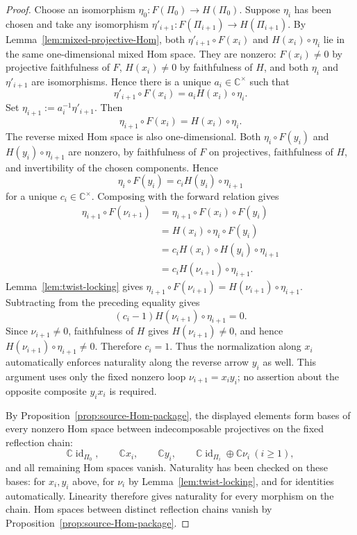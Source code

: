 \documentclass[10pt,a4paper]{amsart}
\def\C{\mathbb{C}}
\newcommand{\id}{\operatorname{id}}
\begin{document}
\begin{proof}
Choose an isomorphism $\eta_0:F(\Pi_0)\to H(\Pi_0)$.  Suppose $\eta_i$
has been chosen and take any isomorphism
$\eta'_{i+1}:F(\Pi_{i+1})\to H(\Pi_{i+1})$.  By
Lemma~\ref{lem:mixed-projective-Hom}, both
$\eta'_{i+1}\circ F(x_i)$ and $H(x_i)\circ\eta_i$ lie in the same one-dimensional
mixed Hom space.  They are nonzero: $F(x_i)\ne0$ by projective faithfulness of $F$,
$H(x_i)\ne0$ by faithfulness of $H$, and both $\eta_i$ and
$\eta'_{i+1}$ are isomorphisms.  Hence there is a unique
$a_i\in\C^\times$ such that
\[
 \eta'_{i+1}\circ F(x_i)=a_i H(x_i)\circ\eta_i.
\]
Set $\eta_{i+1}:=a_i^{-1}\eta'_{i+1}$.  Then
\begin{equation}\label{eq:forward-naturality}
 \eta_{i+1}\circ F(x_i)=H(x_i)\circ\eta_i.
\end{equation}
The reverse mixed Hom space is also one-dimensional.  Both
$\eta_i\circ F(y_i)$ and $H(y_i)\circ\eta_{i+1}$ are nonzero, by
faithfulness of $F$ on projectives, faithfulness of $H$, and invertibility
of the chosen components.  Hence
\begin{equation}\label{eq:reverse-scalar}
 \eta_i\circ F(y_i)=c_iH(y_i)\circ\eta_{i+1}
\end{equation}
for a unique $c_i\in\C^\times$.  Composing with the forward relation gives
\begin{align*}
 \eta_{i+1}\circ F(\nu_{i+1})
 &=\eta_{i+1}\circ F(x_i)\circ F(y_i)\\
 &=H(x_i)\circ\eta_i\circ F(y_i)\\
 &=c_iH(x_i)\circ H(y_i)\circ\eta_{i+1}\\
 &=c_iH(\nu_{i+1})\circ\eta_{i+1}.
\end{align*}
Lemma~\ref{lem:twist-locking} gives
$\eta_{i+1}\circ F(\nu_{i+1})=
H(\nu_{i+1})\circ\eta_{i+1}$.  Subtracting from the
preceding equality gives
\[
 (c_i-1)H(\nu_{i+1})\circ\eta_{i+1}=0.
\]
Since $\nu_{i+1}\ne0$, faithfulness of $H$ gives
$H(\nu_{i+1})\ne0$, and hence
$H(\nu_{i+1})\circ\eta_{i+1}\ne0$.  Therefore $c_i=1$.  Thus the normalization along $x_i$ automatically
enforces naturality along the reverse arrow $y_i$ as well.  This argument
uses only the fixed nonzero loop $\nu_{i+1}=x_i y_i$; no assertion about
the opposite composite $y_i x_i$ is required.

By Proposition~\ref{prop:source-Hom-package}, the displayed elements form
bases of every nonzero Hom space between indecomposable projectives on the
fixed reflection chain:
\[
 \C\id_{\Pi_0},\qquad \C x_i,\qquad \C y_i,
 \qquad \C\id_{\Pi_i}\oplus\C\nu_i\ (i\ge1),
\]
and all remaining Hom spaces vanish.  Naturality has been checked on these
bases: for $x_i,y_i$ above, for $\nu_i$ by
Lemma~\ref{lem:twist-locking}, and for identities automatically.  Linearity
therefore gives naturality for every morphism on the chain.  Hom spaces between distinct reflection chains vanish by
Proposition~\ref{prop:source-Hom-package}.


\end{proof}
\end{document}
